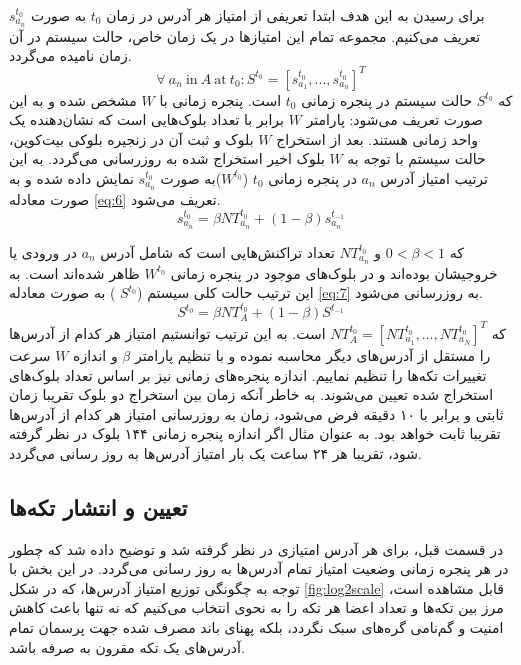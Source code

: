 برای رسیدن به این هدف ابتدا تعریفی از امتیاز هر آدرس در زمان $t_0$ به صورت 
$s_{a_n}^{t_0}$
تعریف می‌کنیم. مجموعه تمام این امتیاز‌ها در یک زمان خاص، حالت سیستم در آن زمان نامیده می‌گردد. 
\begin{equation}
\forall\ a_n\ \text{in}\  A\  \text{at}\  t_0: S^{t_0} = [s_{a_1}^{t_0}, ..., s_{a_n}^{t_0}]^T  
\label{eq:5}
\end{equation}
که
$S^{t_0}$
حالت سیستم در پنجره زمانی $t_0$ است. پنجره زمانی با $W$ مشخص شده و به این صورت تعریف می‌شود: پارامتر $W$ برابر با تعداد بلوک‌هایی است که نشان‌دهنده یک واحد زمانی هستند. بعد از استخراج $W$ بلوک و ثبت آن در زنجیره بلوکی بیت‌کوین، حالت سیستم با توجه به $W$ بلوک اخیر استخراج شده به روزرسانی می‌گردد. به این ترتیب امتیاز آدرس $a_n$ در پنجره زمانی  $t_0$  ($W^{t_0}$)به صورت $s_{a_n}^{t_0}$ نمایش داده شده و به صورت معادله \eqref{eq:6} تعریف می‌شود.
\begin{equation}
s_{a_n}^{t_0} = \beta NT_{a_n}^{t_0} + (1-\beta) s_{a_n}^{t_{-1}}
\label{eq:6}
\end{equation}

که
$0<\beta<1$
و
$NT_{a_n}^{t_0}$
تعداد تراکنش‌هایی است که شامل آدرس $a_n$ در ورودی یا خروجیشان بوده‌اند و در بلوک‌های موجود در پنجره زمانی $W^{t_0}$ ظاهر شده‌اند است. به این ترتیب حالت کلی سیستم ($S^{t_0}$ ) به صورت معادله \eqref{eq:7} به روزرسانی می‌شود.
\begin{equation}
S^{t_0} = \beta NT_{A}^{t_0} + (1-\beta) S^{t_{-1}}
\label{eq:7}
\end{equation}
که 
$NT_{A}^{t_0} = [NT_{a_1}^{t_0}, ..., NT_{a_N}^{t_0}]^T$
است. به این ترتیب توانستیم امتیاز هر کدام از آدرس‌ها را مستقل از آدرس‌های دیگر محاسبه نموده و با تنظیم پارامتر $\beta$ و اندازه $W$ سرعت تغییرات تکه‌ها را تنظیم نماییم. اندازه پنجره‌های زمانی نیز بر اساس تعداد بلوک‌های استخراج شده تعیین می‌شوند. به خاطر آنکه زمان بین استخراج دو بلوک تقریبا زمان ثابتی و برابر با ۱۰ دقیقه فرض می‌شود، زمان به روزرسانی امتیاز هر کدام از آدرس‌ها تقریبا ثابت خواهد بود. به عنوان مثال اگر اندازه پنجره زمانی ۱۴۴ بلوک در نظر گرفته شود، تقریبا هر ۲۴ ساعت یک بار امتیاز آدرس‌ها به روز رسانی می‌گردد.  


\subsection{تعیین و انتشار تکه‌ها}
\label{subsubsection:4.3.2}
در قسمت قبل، برای هر آدرس امتیازی در نظر گرفته شد و توضیح داده شد که چطور در هر پنجره زمانی وضعیت امتیاز تمام آدرس‌ها به روز رسانی می‌گردد. در این بخش با توجه به چگونگی توزیع امتیاز آدرس‌ها، که در شکل \ref{fig:log2scale} قابل مشاهده است، مرز بین تکه‌ها و تعداد اعضا هر تکه را به نحوی انتخاب می‌کنیم که نه تنها باعث کاهش امنیت و گم‌نامی گره‌های سبک نگردد، بلکه پهنای باند مصرف شده جهت پرسمان تمام آدرس‌های یک تکه مقرون به صرفه باشد.

